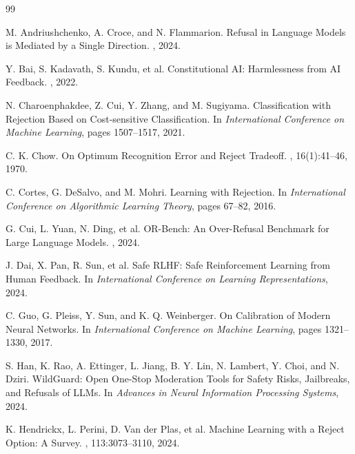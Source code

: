 \documentclass[11pt]{book}
\begin{document}
\begin{thebibliography}{99}

M. Andriushchenko, A. Croce, and N. Flammarion.
\newblock Refusal in Language Models is Mediated by a Single Direction.
, 2024.

Y. Bai, S. Kadavath, S. Kundu, et al.
\newblock Constitutional AI: Harmlessness from AI Feedback.
, 2022.

N. Charoenphakdee, Z. Cui, Y. Zhang, and M. Sugiyama.
\newblock Classification with Rejection Based on Cost-sensitive Classification.
\newblock In {\em International Conference on Machine Learning}, pages 1507--1517, 2021.

C. K. Chow.
\newblock On Optimum Recognition Error and Reject Tradeoff.
, 16(1):41--46, 1970.

C. Cortes, G. DeSalvo, and M. Mohri.
\newblock Learning with Rejection.
\newblock In {\em International Conference on Algorithmic Learning Theory}, pages 67--82, 2016.

G. Cui, L. Yuan, N. Ding, et al.
\newblock OR-Bench: An Over-Refusal Benchmark for Large Language Models.
, 2024.

J. Dai, X. Pan, R. Sun, et al.
\newblock Safe RLHF: Safe Reinforcement Learning from Human Feedback.
\newblock In {\em International Conference on Learning Representations}, 2024.

C. Guo, G. Pleiss, Y. Sun, and K. Q. Weinberger.
\newblock On Calibration of Modern Neural Networks.
\newblock In {\em International Conference on Machine Learning}, pages 1321--1330, 2017.

S. Han, K. Rao, A. Ettinger, L. Jiang, B. Y. Lin, N. Lambert, Y. Choi, and N. Dziri.
\newblock WildGuard: Open One-Stop Moderation Tools for Safety Risks, Jailbreaks, and Refusals of LLMs.
\newblock In {\em Advances in Neural Information Processing Systems}, 2024.

K. Hendrickx, L. Perini, D. Van der Plas, et al.
\newblock Machine Learning with a Reject Option: A Survey.
, 113:3073--3110, 2024.


\end{thebibliography}
\end{document}
